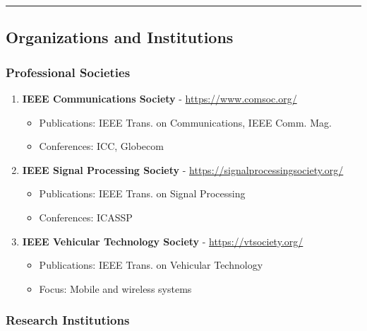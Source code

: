 \begin{center}\rule{0.5\linewidth}{0.5pt}\end{center}

\subsection{\texorpdfstring{Organizations and Institutions}{Organizations and Institutions}}\label{organizations-and-institutions}

\subsubsection{Professional Societies}\label{professional-societies}

\begin{enumerate}
\def\labelenumi{\arabic{enumi}.}
\setcounter{enumi}{56}
\tightlist
\item
  \textbf{IEEE Communications Society} - \url{https://www.comsoc.org/}

  \begin{itemize}
  \tightlist
  \item
    Publications: IEEE Trans. on Communications, IEEE Comm. Mag.
  \item
    Conferences: ICC, Globecom
  \end{itemize}
\item
  \textbf{IEEE Signal Processing Society} - \url{https://signalprocessingsociety.org/}

  \begin{itemize}
  \tightlist
  \item
    Publications: IEEE Trans. on Signal Processing
  \item
    Conferences: ICASSP
  \end{itemize}
\item
  \textbf{IEEE Vehicular Technology Society} - \url{https://vtsociety.org/}

  \begin{itemize}
  \tightlist
  \item
    Publications: IEEE Trans. on Vehicular Technology
  \item
    Focus: Mobile and wireless systems
  \end{itemize}
\end{enumerate}

\subsubsection{Research Institutions}\label{research-institutions}

